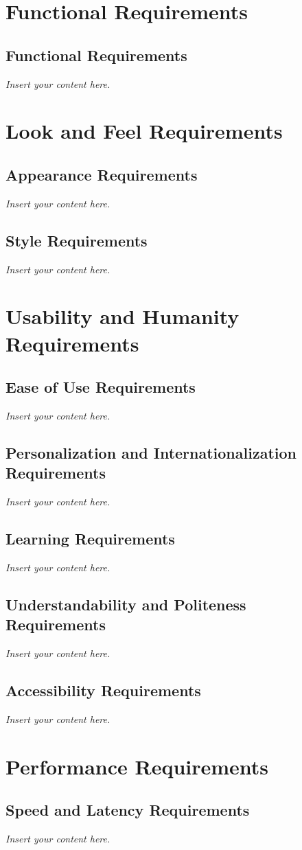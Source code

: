\documentclass[12pt]{article}
\newcommand{\lips}{\textit{Insert your content here.}}
\begin{document}
\section{Functional Requirements}
\subsection{Functional Requirements}
\lips

\section{Look and Feel Requirements}
\subsection{Appearance Requirements}
\lips
\subsection{Style Requirements}
\lips

\section{Usability and Humanity Requirements}
\subsection{Ease of Use Requirements}
\lips
\subsection{Personalization and Internationalization Requirements}
\lips
\subsection{Learning Requirements}
\lips
\subsection{Understandability and Politeness Requirements}
\lips
\subsection{Accessibility Requirements}
\lips

\section{Performance Requirements}
\subsection{Speed and Latency Requirements}
\lips
\end{document}
